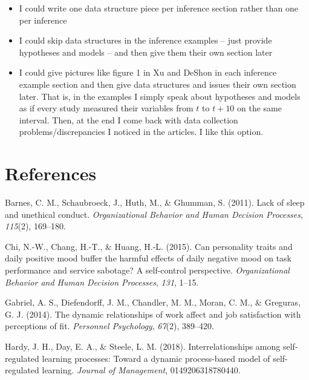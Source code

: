 \documentclass[english,,man]{apa6}
\theoremstyle{definition}
\theoremstyle{definition}
\theoremstyle{definition}
\theoremstyle{remark}
\begin{document}
\begin{enumerate}
\begin{itemize}
    \begin{itemize}
    \item
      I could write one data structure piece per inference section
      rather than one per inference
    \item
      I could skip data structures in the inference examples -- just
      provide hypotheses and models -- and then give them their own
      section later
    \item
      I could give pictures like figure 1 in Xu and DeShon in each
      inference example section and then give data structures and issues
      their own section later. That is, in the examples I simply speak
      about hypotheses and models as if every study measured their
      variables from \(t\) to \(t + 10\) on the same interval. Then, at
      the end I come back with data collection problems/discrepancies I
      noticed in the articles. I like this option.
    \end{itemize}
  \end{itemize}
\end{enumerate}

\newpage

\hypertarget{references}{%
\section{References}\label{references}}

\setlength{\parindent}{-0.5in}
\setlength{\leftskip}{0.5in}

\hypertarget{refs}{}
\leavevmode\hypertarget{ref-barnes2011}{}%
Barnes, C. M., Schaubroeck, J., Huth, M., \& Ghumman, S. (2011). Lack of
sleep and unethical conduct. \emph{Organizational Behavior and Human
Decision Processes}, \emph{115}(2), 169--180.

\leavevmode\hypertarget{ref-chi2015}{}%
Chi, N.-W., Chang, H.-T., \& Huang, H.-L. (2015). Can personality traits
and daily positive mood buffer the harmful effects of daily negative
mood on task performance and service sabotage? A self-control
perspective. \emph{Organizational Behavior and Human Decision
Processes}, \emph{131}, 1--15.

\leavevmode\hypertarget{ref-gabriel2014}{}%
Gabriel, A. S., Diefendorff, J. M., Chandler, M. M., Moran, C. M., \&
Greguras, G. J. (2014). The dynamic relationships of work affect and job
satisfaction with perceptions of fit. \emph{Personnel Psychology},
\emph{67}(2), 389--420.

\leavevmode\hypertarget{ref-hardy2018}{}%
Hardy, J. H., Day, E. A., \& Steele, L. M. (2018). Interrelationships
among self-regulated learning processes: Toward a dynamic process-based
model of self-regulated learning. \emph{Journal of Management},
0149206318780440.
\end{document}
